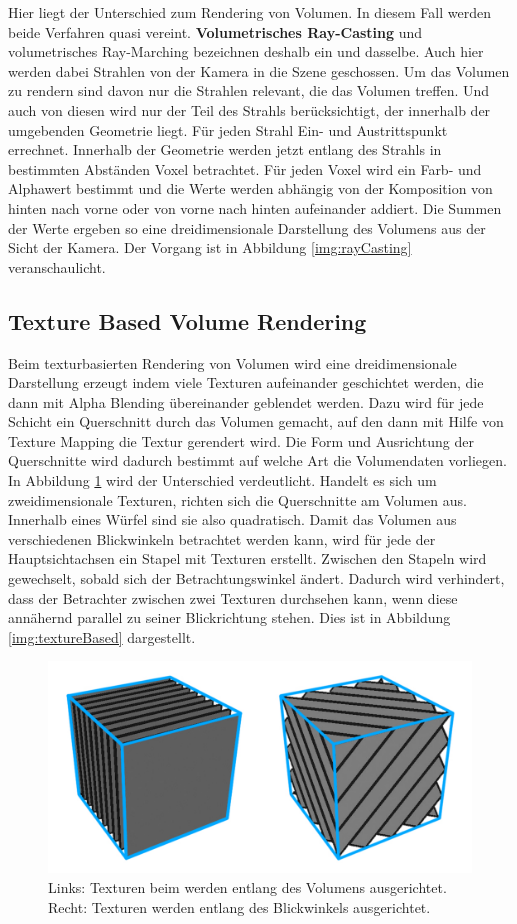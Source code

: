 Hier liegt der Unterschied zum Rendering von Volumen. In diesem Fall werden beide Verfahren quasi vereint. \textbf{Volumetrisches Ray-Casting} und volumetrisches Ray-Marching bezeichnen deshalb ein und dasselbe. Auch hier werden dabei Strahlen von der Kamera in die Szene geschossen. Um das Volumen zu rendern sind davon nur die Strahlen relevant, die das Volumen treffen. Und auch von diesen wird nur der Teil des Strahls berücksichtigt, der innerhalb der umgebenden Geometrie liegt. Für jeden Strahl Ein- und Austrittspunkt errechnet. Innerhalb der Geometrie werden jetzt entlang des Strahls in bestimmten Abständen Voxel betrachtet. Für jeden Voxel wird ein Farb- und Alphawert bestimmt und die Werte werden abhängig von der Komposition von hinten nach vorne oder von vorne nach hinten aufeinander addiert. Die Summen der Werte ergeben so eine dreidimensionale Darstellung des Volumens aus der Sicht der Kamera. Der Vorgang ist in Abbildung \ref{img:rayCasting} veranschaulicht.


\subsection{Texture Based Volume Rendering}

Beim texturbasierten Rendering von Volumen wird eine dreidimensionale Darstellung erzeugt indem viele Texturen aufeinander geschichtet werden, die dann mit Alpha Blending übereinander geblendet werden. Dazu wird für jede Schicht ein Querschnitt durch das Volumen gemacht, auf den dann mit Hilfe von Texture Mapping die Textur gerendert wird.
Die Form und Ausrichtung der Querschnitte wird dadurch bestimmt auf welche Art die Volumendaten vorliegen. In Abbildung \ref{img:2D3DTex} wird der Unterschied verdeutlicht. Handelt es sich um zweidimensionale Texturen,  richten sich die Querschnitte am Volumen aus. Innerhalb eines Würfel sind sie also quadratisch. Damit das Volumen aus verschiedenen Blickwinkeln betrachtet werden kann, wird für jede der Hauptsichtachsen ein Stapel mit Texturen erstellt. Zwischen den Stapeln wird gewechselt, sobald sich der Betrachtungswinkel ändert. Dadurch wird verhindert, dass der Betrachter zwischen zwei Texturen durchsehen kann, wenn diese annähernd parallel zu seiner Blickrichtung stehen. Dies ist in Abbildung \ref{img:textureBased} dargestellt.

\begin{figure}
	\centering
	\includegraphics[width=0.7\linewidth]{images/texture_2d3d.pdf}
	\caption{Links: Texturen beim werden entlang des Volumens ausgerichtet. Recht: Texturen werden entlang des Blickwinkels ausgerichtet.}
	\label{img:2D3DTex}
\end{figure}


